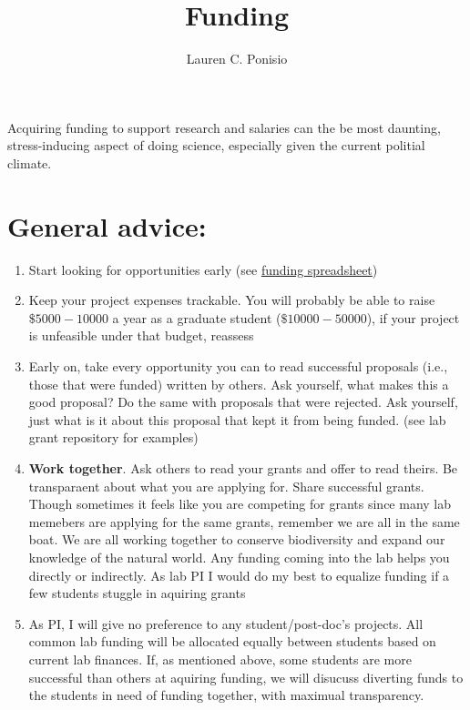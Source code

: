 \documentclass[12pt]{article}
\title{Funding}
\author{Lauren C. Ponisio}
\begin{document}
\maketitle

Acquiring funding to support research and salaries can the be most
daunting, stress-inducing aspect of doing science, especially given
the current politial climate.

\section{General advice:}

\begin{enumerate}
\item Start looking for opportunities early (see 
  \href{https://docs.google.com/spreadsheets/d/1X2Dyz4HW13hsTmNoUvSoMYOmyobVVtfoGtEtdS0LQtI/edit?usp=sharing}{funding
    spreadsheet}) 
\item Keep your project expenses trackable. You will probably be able
  to raise $\$5000-10000$ a year as a graduate student
  ($\$10000-50000$), if your project is unfeasible under that budget,
  reassess
\item Early on, take every opportunity you can to read successful
  proposals (i.e., those that were funded) written by others. Ask
  yourself, what makes this a good proposal? Do the same with
  proposals that were rejected. Ask yourself, just what is it about
  this proposal that kept it from being funded. (see lab grant
  repository for examples)
\item \textbf{Work together}. Ask others to read your grants and offer
  to read theirs. Be transparaent about what you are applying
  for. Share successful grants. Though sometimes it feels like you are
  competing for grants since many lab memebers are applying for the
  same grants, remember we are all in the same boat. We are all
  working together to conserve biodiversity and expand our knowledge
  of the natural world. Any funding coming into the lab helps you
  directly or indirectly. As lab PI I would do my best to equalize
  funding if a few students stuggle in aquiring grants
\item As PI, I will give no preference to any student/post-doc's
  projects. All common lab funding will be allocated equally between
  students based on current lab finances. If, as mentioned above, some
  students are more successful than others at aquiring funding, we will
  disucuss diverting funds to the students in need of funding
  together, with maximual transparency. 
\end{enumerate}
\end{document}
